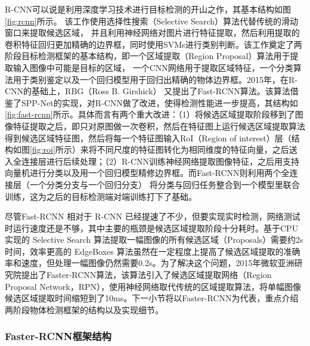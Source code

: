 R-CNN可以说是利用深度学习技术进行目标检测的开山之作，其基本结构如图\ref{fig:rcnn}所示。 该工作使用选择性搜索（Selective Search）算法\cite{UijlingsSelective}代替传统的滑动窗口来提取候选区域， 并且利用神经网络对图片进行特征提取，然后利用提取的卷积特征回归更加精确的边界框，同时使用SVMs进行类别判断。该工作奠定了两阶段目标检测框架的基本结构，即一个区域提取（Region Proposal）算法用于提取输入图像中可能是目标的区域， 一个CNN网络用于提取区域特征，一个分类算法用于类别鉴定以及一个回归模型用于回归出精确的物体边界框。2015年，在R-CNN的基础上，RBG（Ross B. Girshick） 又提出了Fast-RCNN算法。该算法借鉴了SPP-Net\cite{7005506}的实现，对R-CNN做了改进，使得检测性能进一步提高，其结构如 \figurename \, \ref{fig:fast-rcnn}所示。具体而言有两个重大改进：（1）将候选区域提取阶段移到了图像特征提取之后，即只对原图做一次卷积，然后在特征图上运行候选区域提取算法得到候选区域特征图，然后将每一个特征图输入RoI（Region of interest）层（结构如图\ref{fig:roi}所示）来将不同尺度的特征图转化为相同维度的特征向量，之后送入全连接层进行后续处理；（2）R-CNN训练神经网络提取图像特征，之后用支持向量机进行分类以及用一个回归模型精修边界框。而Fast-RCNN则利用两个全连接层（一个分类分支与一个回归分支） 将分类与回归任务整合到一个模型里联合训练，这为之后的目标检测端对端训练打下了基础。



尽管Fast-RCNN 相对于 R-CNN 已经提速了不少，但要实现实时检测，网络测试时运行速度还是不够，其中主要的瓶颈是候选区域提取阶段十分耗时。基于CPU实现的 Selective Search 算法提取一幅图像的所有候选区域（Proposals）需要约2s时间，效率更高的 EdgeBoxes\cite{Zitnick2014Edge} 算法虽然在一定程度上提高了候选区域提取的准确率和速度，但处理一幅图像仍然需要0.2s。为了解决这个问题，2015年微软亚洲研究院提出了Faster-RCNN算法，该算法引入了候选区域提取网络（Region Proposal Network，RPN），使用神经网络取代传统的区域提取算法，将单幅图像候选区域提取时间缩短到了10ms。下一小节将以Faster-RCNN为代表，重点介绍两阶段物体检测框架的结构以及实现细节。

\subsubsection{Faster-RCNN框架结构}



